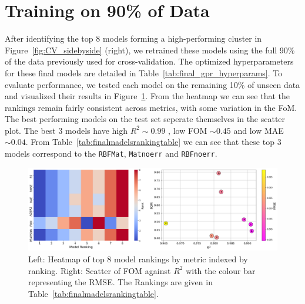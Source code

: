 \documentclass{ucdgradtaughtthesis}
\begin{document}
\section{Training on 90\% of Data}
After identifying the top 8 models forming a high-performing cluster in Figure~\ref{fig:CV_sidebyside} (right),
we retrained these models using the full 90\% of the data previously used for cross-validation. The optimized hyperparameters for these final models are detailed in Table~\ref{tab:final_gpr_hyperparams}. 
To evaluate performance, we tested each model on the remaining 10\% of unseen data and visualized their results in Figure~\ref{fig:comparing_metrics}.
From the heatmap we can see that the rankings remain fairly consistent across metrics, with some variation in the FoM. The best performing models on the test set seperate themselves in the scatter plot. The best 3 models have high \(R^2 \sim 0.99\) , low FOM \(\sim 0.45\) and low MAE \(\sim 0.04\).
From Table~\ref{tab:finalmadelsrankingtable} we can see that these top 3 models correspond to the \texttt{RBFMat}, \texttt{Matnoerr} and \texttt{RBFnoerr}.
\begin{figure}[H]
    \centering
    \includegraphics[width=\textwidth]{LatexPlots/final_gps_plots/metric_of_finalists_comparison.png}
    \caption[Visualising the ranking of each model on the test data.]{Left: Heatmap of top 8 model rankings by metric indexed by ranking.
    Right: Scatter of FOM against \(R^2\) with the colour bar representing the RMSE.
    The Rankings are given in Table~\ref{tab:finalmadelsrankingtable}.}
    \label{fig:comparing_metrics}
\end{figure}
\end{document}

